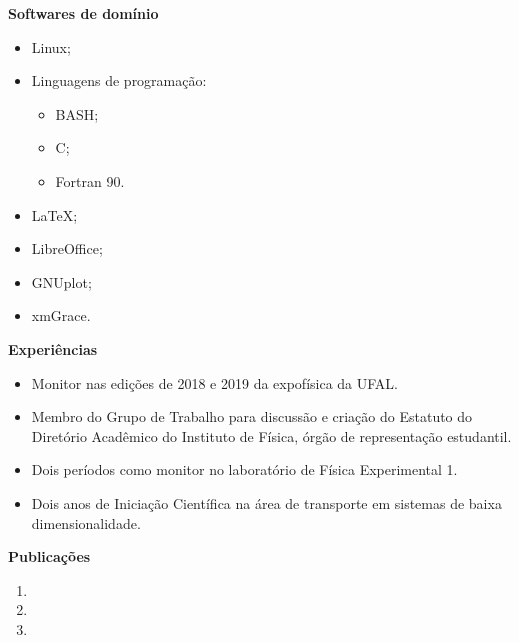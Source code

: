 \documentclass[
   12pt,                         %
   a4paper,                      %
   spanish,                      %
   brazil,                       %
   xcolor=table                  %
]{abntex2}
\begin{document}
   \begin{flushleft}
      \hline \vspace{2pt}
      \textbf{Softwares de domínio} \vspace{2pt} \hline
   \end{flushleft}
   \begin{itemize}[nosep]
      \item Linux;
      \item Linguagens de programação:
      \begin{itemize}[nosep]
         \item BASH;
         \item C;
         \item Fortran 90.
      \end{itemize}
      \item \LaTeX;
      \item LibreOffice;
      \item GNUplot;
      \item xmGrace.
   \end{itemize}

   \begin{flushleft}
      \hline \vspace{2pt}
      \textbf{Experiências} \vspace{2pt} \hline
   \end{flushleft}
   \begin{itemize}[nosep]
      \item Monitor nas edições de 2018 e 2019 da expofísica da UFAL.
      \item Membro do Grupo de Trabalho para discussão e criação do Estatuto do
      Diretório Acadêmico do Instituto de Física, órgão de representação estudantil.
      \item Dois períodos como monitor no laboratório de Física Experimental 1.
      \item Dois anos de Iniciação Científica na área de
      transporte em sistemas de baixa dimensionalidade.
   \end{itemize}

   \begin{flushleft}
      \hline \vspace{2pt}
      \textbf{Publicações} \vspace{2pt} \hline
   \end{flushleft}
   \begin{enumerate}[nosep]
      \item {}
      \item {}
      \item {}
   \end{enumerate}
\end{document}

